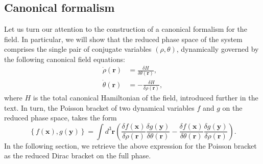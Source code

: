 \documentclass[twocolumn, nofootinbib, nobibnotes, amsmath,amssymb,aps, pra, floatfix]{revtex4-1}
\renewcommand{\v}[1]{\ensuremath{\mathbf{#1}}} %
\begin{document}
\subsection{\label{sec:GPfieldHydrodynamicCanonicalFormalism}Canonical formalism}
Let us turn our attention to the construction of a canonical formalism for the field.
In particular, we will show that the reduced phase space of the system comprises the single pair of conjugate variables $\left( \rho,\theta \right)$, dynamically governed by the following canonical field equations:
\begin{align}
  \dot{\rho}\left( \v{r} \right)&=\frac{\delta H}{\delta\theta\left( \v{r} \right)}, \label{eq:canonicalHydrodynamicalFieldEquationRhoDot}\\
  \dot{\theta}\left( \v{r} \right)&=-\frac{\delta H}{\delta\rho\left( \v{r} \right)}, \label{eq:canonicalHydrodynamicalFieldEquationThetaDot}
\end{align}
where $H$ is the total canonical Hamiltonian of the field, introduced further in the text.
In turn, the Poisson bracket of two dynamical variables $f$ and $g$ on the reduced phase space, takes the form
\begin{equation}
  \left\{ f\left( \v{x} \right),g\left( \v{y} \right) \right\}=\int d^3\v{r}\left( \frac{\delta f\left( \v{x} \right)}{\delta\rho\left( \v{r} \right)}\frac{\delta g\left( \v{y} \right)}{\delta\theta\left( \v{r} \right)}-\frac{\delta f\left( \v{x} \right)}{\delta\theta\left( \v{r} \right)}\frac{\delta g\left( \v{y} \right)}{\delta\rho\left( \v{r} \right)} \right).
  \label{eq:poissonBracketReducedPhaseSpace}
\end{equation}
In the following section, we retrieve the above expression for the Poisson bracket as the reduced Dirac bracket on the full phase.
\end{document}
